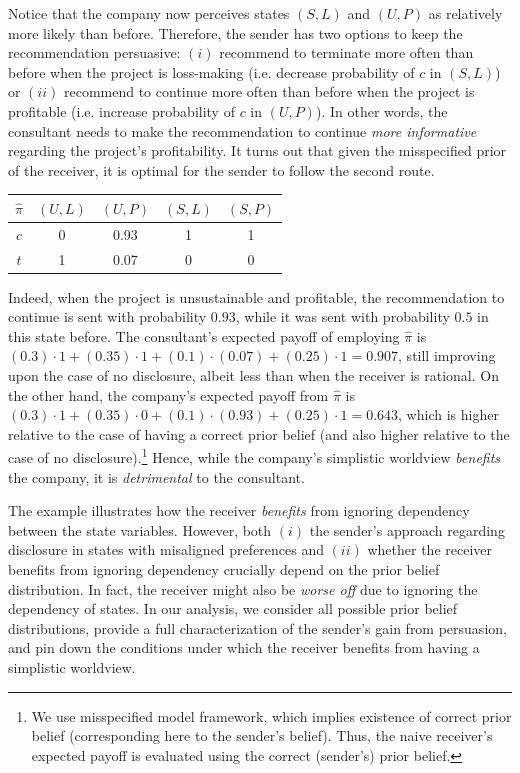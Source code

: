 \documentclass[12pt,english]{article}
\theoremstyle{plain}
\begin{document}
\noindent Notice that the company now perceives states $(S,L)$ and $(U,P)$ as relatively more likely than before. 
Therefore, the sender has two options to keep the recommendation persuasive: $(i)$ recommend to terminate more often than before when the project is loss-making (i.e. decrease probability of $c$ in $(S,L)$) or $(ii)$ recommend to continue more often than before when the project is profitable (i.e. increase probability of $c$ in $(U,P)$). 
In other words, the consultant needs to make the recommendation to continue \emph{more informative} regarding the project's profitability.
It turns out that given the misspecified prior of the receiver, it is optimal for the sender to follow the second route.  
\begin{table}[H]
\centering
\begin{tabular}{c|cccc}
$ \hat\pi $ & $ (U,L) $ & $ (U,P) $ & $(S,L)$ & $(S,P)$ \\
\hline
$c$ & 0 & 0.93 & 1 & 1 \\[0.1cm]
$t$ & 1 & 0.07 & 0 & 0 
\end{tabular}
\end{table}

\noindent Indeed, when the project is unsustainable and profitable, the recommendation to continue is sent with probability $0.93$, while it was sent with probability $0.5$ in this state before. 
The consultant's expected payoff of employing $\hat\pi$ is $(0.3)\cdot 1+(0.35)\cdot 1+(0.1)\cdot (0.07)+(0.25)\cdot 1=0.907$, still improving upon the case of no disclosure, albeit less than when the receiver is rational.  
On the other hand, the company's expected payoff from $\hat\pi$ is $(0.3)\cdot 1+(0.35)\cdot 0+(0.1)\cdot (0.93)+(0.25)\cdot 1=0.643$, which is higher relative to the case of having a correct prior belief (and also higher relative to the case of no disclosure).\footnote{We use misspecified model framework, which implies existence of correct prior belief (corresponding here to the sender's belief). Thus, the naive receiver's expected payoff is evaluated using the correct (sender's) prior belief.} 
Hence, while the company's simplistic worldview \emph{benefits} the company, it is \emph{detrimental} to the consultant. 

The example illustrates how the receiver \emph{benefits} from ignoring dependency between the state variables.
However, both $(i)$ the sender's approach regarding disclosure in states with misaligned preferences and $(ii)$ whether the receiver benefits from ignoring dependency crucially depend on the prior belief distribution.
In fact, the receiver might also be \emph{worse off} due to ignoring the dependency of states. 
In our analysis, we consider all possible prior belief distributions, provide a full characterization of the sender's gain from persuasion, and pin down the conditions under which the receiver benefits from having a simplistic worldview.  
\end{document}
